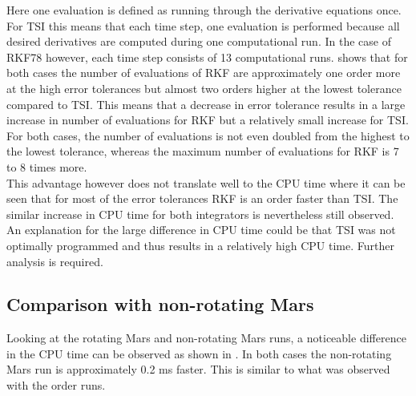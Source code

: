 \noindent
Here one evaluation is defined as running through the derivative equations once. For \ac{TSI} this means that each time step, one evaluation is performed because all desired derivatives are computed during one computational run. In the case of \ac{RKF78} however, each time step consists of 13 computational runs.  shows that for both cases the number of evaluations of \ac{RKF} are approximately one order more at the high error tolerances but almost two orders higher at the lowest tolerance compared to \ac{TSI}. This means that a decrease in error tolerance results in a large increase in number of evaluations for \ac{RKF} but a relatively small increase for \ac{TSI}. For both cases, the number of evaluations is not even doubled from the highest to the lowest tolerance, whereas the maximum number of evaluations for \ac{RKF} is 7 to 8 times more. \\

\noindent
This advantage however does not translate well to the CPU time where it can be seen that for most of the error tolerances \ac{RKF} is an order faster than \ac{TSI}. The similar increase in CPU time for both integrators is nevertheless still observed. An explanation for the large difference in CPU time could be that \ac{TSI} was not optimally programmed and thus results in a relatively high CPU time. Further analysis is required.


%


\subsection{Comparison with non-rotating Mars}
\label{subsec:errorToleranceCompNotRot}
Looking at the rotating Mars and non-rotating Mars runs, a noticeable difference in the CPU time can be observed as shown in . In both cases the non-rotating Mars run is approximately 0.2 ms faster. This is similar to what was observed with the order runs.


